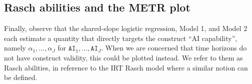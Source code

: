 \documentclass{article}
\theoremstyle{definition}
\newcommand{\thfifty}{\mathbf{th}_{50}}
\newcommand{\AI}{\texttt{AI}}
\begin{document}



\subsection{Rasch abilities and the METR plot}

Finally, observe that the shared-slope logistic regression, Model 1, and Model 2 each estimate a quantity that directly targets the construct ``AI capability'', namely $\alpha_1, \dots, \alpha_J$ for $\AI_1, \dots, \AI_J$. When we are concerned that time horizons do not have construct validity, this could be plotted instead. We refer to them as Rasch abilities, in reference to the IRT Rasch model where a similar notion can be defined. 
\end{document}
